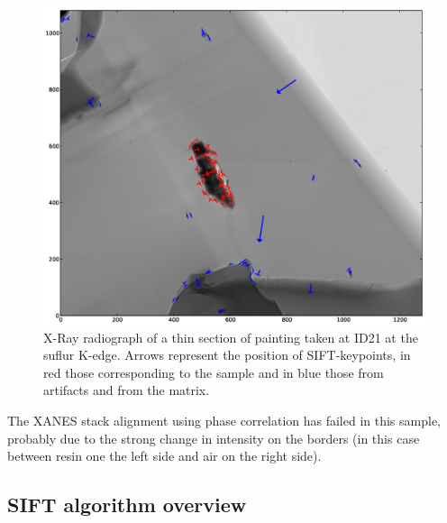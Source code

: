 \documentclass[preprint]{iucr}
\begin{document}
\begin{figure}
\begin{center}
\includegraphics[width=15cm]{features.eps}
\caption{\label{sample} X-Ray radiograph of a thin section of painting
taken at ID21 at the suflur K-edge. Arrows represent the position of
SIFT-keypoints, in red those corresponding to the sample and in blue those from artifacts and from
the matrix.}
\end{center}
\end{figure}

The XANES stack alignment using phase correlation has failed in this sample,
probably due to the strong change in intensity on the borders (in this case 
between resin one the left side and air on the right side).

\subsection{SIFT algorithm overview}

\end{document}
